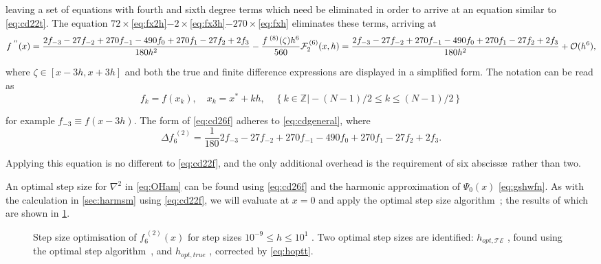 leaving a set of equations with fourth and sixth degree terms which need be eliminated in order to arrive at an equation similar to \cref{eq:cd22t}.
The equation $72\times$\cref{eq:fx2h}$-2\times$\cref{eq:fx3h}$-270\times$\cref{eq:fxh} eliminates these terms, arriving at
{\mathindent=0.3cm
\begin{equation}
f^{\;''}(x) = \frac{2f_{-3}-27f_{-2}+270f_{-1}-490f_{0}+270f_{1}-27f_{2}+2f_{3}}{180h^{2}}-\frac{f^{\;(8)}(\zeta)h^6}{560}\label{eq:cd26t}\\
\mathcal{F}_2^{\,(6)}(x,h) = \frac{2f_{-3}-27f_{-2}+270f_{-1}-490f_{0}+270f_{1}-27f_{2}+2f_{3}}{180h^{2}} + \mathcal{O}(h^6),\label{eq:cd26f}
\end{equation}
}

where $\zeta \in [x-3h,x+3h]$ and both the true and finite difference expressions are displayed in a simplified form.
The notation can be read as
\begin{equation}
f_k = f(x_k), \quad x_k=x^*+kh, \quad \left\{k \in \mathbb{Z} \vert -(N-1)/2 \leq k \leq  (N-1)/2 \right\}
\end{equation}

for example $f_{-3} \equiv f(x-3h)$.
The form of \cref{eq:cd26f} adheres to \cref{eq:cdgeneral}, where
\begin{equation}
\Delta f_6^{\;(2)} = \frac{1}{180}2f_{-3}-27f_{-2}+270f_{-1}-490f_{0}+270f_{1}-27f_{2}+2f_{3}.\label{eq:f62x}
\end{equation}

Applying this equation is no different to \cref{eq:cd22f}, and the only additional overhead is the requirement of six absciss\ae\ rather than two.

An optimal step size for $\nabla^2$ in \cref{eq:OHam} can be found using  \cref{eq:cd26f} and the harmonic approximation of $\Psi_0(x)$ \cref{eq:gshwfn}.
As with the calculation in \cref{sec:harmsm} using \cref{eq:cd22f}, we will evaluate at $x = 0$ and apply the optimal step size algorithm~\cite{Mathur2012}; the results of which are shown in \cref{fig:hopt7pt}.
\begin{figure}[htp]
\centering
\resizebox{\textwidth}{!}{}
\caption[Step size optimisation of $f_2^{\;(6)}(x)$]{\label{fig:hopt7pt}Step size optimisation of $f_6^{\;(2)}(x)$ for step sizes $10^{-9}\!\leq\! h\! \leq\! 10^1$ . Two optimal step sizes are identified: $h_{opt,\mathcal{TE}}$ , found using the optimal step algorithm~\cite{Mathur2012}, and $h_{opt,true}$ , corrected by \cref{eq:hoptt}.}
\end{figure}

